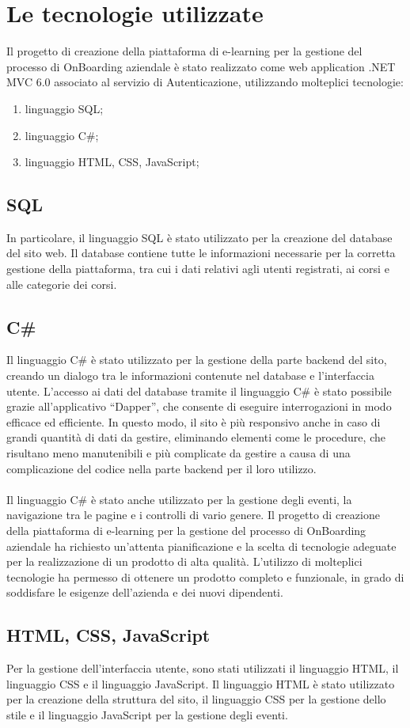 \chapter{Le tecnologie utilizzate}\label{chapter:formattazione}
%
Il progetto di creazione della piattaforma di e-learning per la gestione del processo di 
OnBoarding aziendale è stato realizzato come web application .NET MVC 6.0 associato al servizio di Autenticazione,
utilizzando molteplici tecnologie:
%
\begin{enumerate}
    \item linguaggio SQL;
    \item linguaggio C\#;
    \item linguaggio HTML, CSS, JavaScript;
\end{enumerate}
%
\section{SQL}\label{sec:cap_sec_subsec}
In particolare, il linguaggio SQL è stato utilizzato per 
la creazione del database del sito web. Il database contiene tutte le informazioni 
necessarie per la corretta gestione della piattaforma, tra cui i dati relativi agli utenti 
registrati, ai corsi e alle categorie dei corsi.
%
\section{C\#}\label{sec:cap_sec_subsec}
Il linguaggio C\# è stato utilizzato per la gestione della parte backend del sito, 
creando un dialogo tra le informazioni contenute nel database e l'interfaccia utente. 
L'accesso ai dati del database tramite il linguaggio C\# è stato possibile grazie 
all'applicativo ``Dapper'', che consente di eseguire interrogazioni in modo efficace ed 
efficiente. In questo modo, il sito è più responsivo anche in caso di grandi quantità di 
dati da gestire, eliminando elementi come le procedure, che risultano meno 
manutenibili e più complicate da gestire a causa di una complicazione del codice nella 
parte backend per il loro utilizzo. 
\\ \\
Il linguaggio C\# è stato anche utilizzato per la 
gestione degli eventi, la navigazione tra le pagine e i controlli di vario genere.
Il progetto di creazione della piattaforma di e-learning per la gestione del processo di 
OnBoarding aziendale ha richiesto un'attenta pianificazione e la scelta di tecnologie 
adeguate per la realizzazione di un prodotto di alta qualità. L'utilizzo di molteplici 
tecnologie ha permesso di ottenere un prodotto completo e funzionale, in grado di 
soddisfare le esigenze dell'azienda e dei nuovi dipendenti.
%
\section{HTML, CSS, JavaScript}\label{sec:cap_sec_subsec}
Per la gestione dell'interfaccia utente, sono stati utilizzati il linguaggio HTML, il 
linguaggio CSS e il linguaggio JavaScript. Il linguaggio HTML è stato utilizzato per la 
creazione della struttura del sito, il linguaggio CSS per la gestione dello stile e il 
linguaggio JavaScript per la gestione degli eventi.